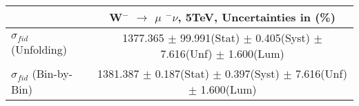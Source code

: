 \documentclass[12pt]{article}
\begin{document}
\begin{table}[ht]
\begin{tabular}{c|c|}
\cline{2-2}
                                                           &    W$^{-}$ $\rightarrow$ $\mu$ $^{-} \nu $, 5TeV, Uncertainties in (\%)  \\ \hline 
\multicolumn{1}{|l|}{$\sigma_{fid}$ (Unfolding)}         &    1377.365   $\pm$ 99.991(Stat) $\pm$ 0.405(Syst) $\pm$ 7.616(Unf) $\pm$ 1.600(Lum)     \\ \hline 
\multicolumn{1}{|l|}{$\sigma_{fid}$ (Bin-by-Bin)}        &    1381.387   $\pm$ 0.187(Stat) $\pm$ 0.397(Syst) $\pm$ 7.616(Unf) $\pm$ 1.600(Lum)     \\ \hline 
\end{tabular}
\end{table}
\end{document}
